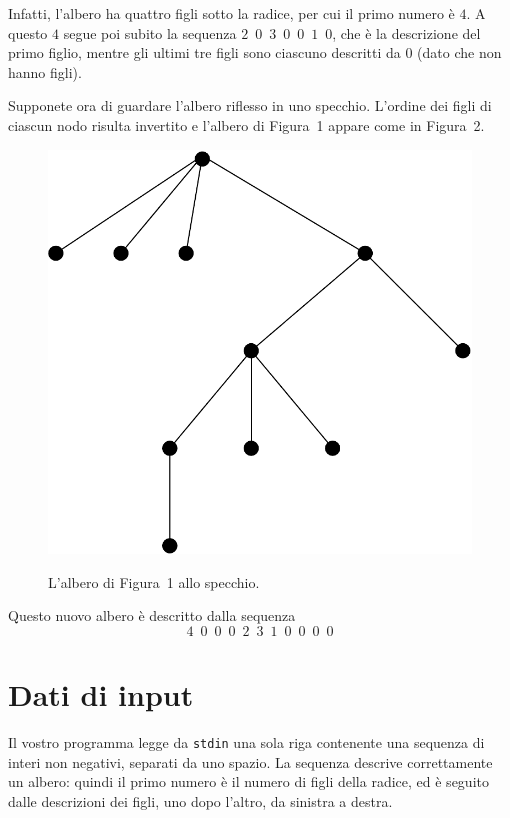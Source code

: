 \documentclass[a4paper,11pt]{article}
\begin{document}
Infatti, l'albero ha quattro figli sotto la radice, per cui il primo numero \`e $4$. A questo $4$ segue poi subito la sequenza $2\,\,\,0\,\,\,3\,\,\,0\,\,\,0\,\,\,1\,\,\,0$, che \`e la descrizione del primo figlio, mentre gli ultimi tre figli sono ciascuno descritti da $0$ (dato che non hanno figli).

Supponete ora di guardare l'albero riflesso in uno specchio. L'ordine dei figli di ciascun nodo risulta invertito e l'albero di Figura~1 appare come in Figura~2.

\begin{figure}[h!]
  \centering
    \includegraphics[scale=0.3]{figs/fig2.pdf}\\
    \caption{L'albero di Figura~1 allo specchio.}
\end{figure}

Questo nuovo albero \`e descritto dalla sequenza
\[
4\,\,\,0\,\,\,0\,\,\,0\,\,\,2\,\,\,3\,\,\,1\,\,\,0\,\,\,0\,\,\,0\,\,\,0
\]

\section*{Dati di input}

Il vostro programma legge da \verb'stdin' una sola riga contenente una sequenza di interi non negativi, separati da uno spazio. La sequenza descrive correttamente un albero: quindi il primo numero \`e il numero di figli della radice, ed \`e seguito dalle descrizioni dei figli, uno dopo l'altro, da sinistra a destra.
\end{document}
